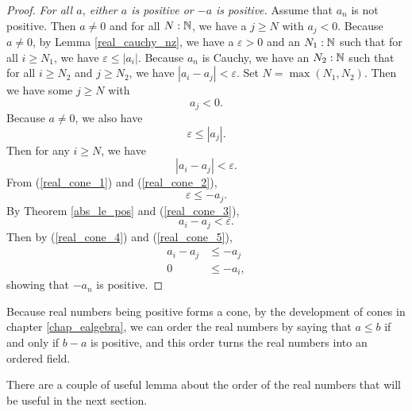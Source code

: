 \documentclass[../../math.tex]{subfiles}
\begin{document}
\begin{proof}
    \textit{For all $a$, either $a$ is positive or $-a$ is positive.}  Assume
    that $a_n$ is not positive.  Then $a \neq 0$ and for all $N : \mathbb{N}$, we have
    a $j \geq N$ with $a_j < 0$.  Because $a \neq 0$, by Lemma
    \ref{real_cauchy_nz}, we have a $\varepsilon > 0$ and an $N_1 : \mathbb{N}$ such
    that for all $i \geq N_1$, we have $\varepsilon \leq |a_i|$.  Because $a_n$
    is Cauchy, we have an $N_2 : \mathbb{N}$ such that for all $i \geq N_2$ and $j \geq
    N_2$, we have $|a_i - a_j| < \varepsilon$.  Set $N = \max(N_1, N_2)$.  Then
    we have some $j \geq N$ with
    \begin{equation} \label{real_cone_1}
        a_j < 0.
    \end{equation}
    Because $a \neq 0$, we also have
    \begin{equation} \label{real_cone_2}
        \varepsilon \leq |a_j|.
    \end{equation}
    Then for any $i \geq N$, we have
    \begin{equation} \label{real_cone_3}
        |a_i - a_j| < \varepsilon.
    \end{equation}
    From (\ref{real_cone_1}) and (\ref{real_cone_2}),
    \begin{equation} \label{real_cone_4}
        \varepsilon \leq -a_j.
    \end{equation}
    By Theorem \ref{abs_le_pos} and (\ref{real_cone_3}),
    \begin{equation} \label{real_cone_5}
        a_i - a_j < \varepsilon.
    \end{equation}
    Then by (\ref{real_cone_4}) and (\ref{real_cone_5}),
    \begin{align*}
        a_i - a_j &\leq -a_j \\
        0 &\leq -a_i,
    \end{align*}
    showing that $-a_n$ is positive.
\end{proof}

Because real numbers being positive forms a cone, by the development of cones in
chapter \ref{chap_ealgebra}, we can order the real numbers by saying that $a
\leq b$ if and only if $b - a$ is positive, and this order turns the real
numbers into an ordered field.

There are a couple of useful lemma about the order of the real numbers that will
be useful in the next section.
\end{document}

